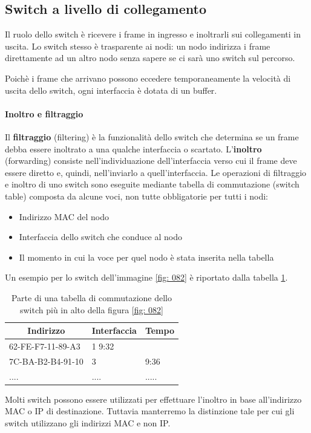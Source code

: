 \documentclass[11pt,a4paper]{book}
\begin{document}
\subsection{Switch a livello di collegamento}
Il ruolo dello switch è ricevere i frame in ingresso e inoltrarli sui collegamenti in uscita. Lo switch stesso è trasparente ai nodi: un nodo indirizza i frame direttamente ad un altro nodo senza sapere se ci sarà uno switch sul percorso.

Poichè i frame che arrivano possono eccedere temporaneamente la velocità di uscita dello switch, ogni interfaccia è dotata di un buffer.

\paragraph{Inoltro e filtraggio}
Il \textbf{filtraggio} (filtering) è la funzionalità dello switch che determina se un frame debba essere inoltrato a una qualche interfaccia o scartato. L'\textbf{inoltro} (forwarding) consiste nell'individuazione dell'interfaccia verso cui il frame deve essere diretto e, quindi, nell'inviarlo a quell'interfaccia. Le operazioni di filtraggio e inoltro di uno switch sono eseguite mediante tabella di commutazione (switch table) composta da alcune voci, non tutte obbligatorie per tutti i nodi:
\begin{itemize}
	\item Indirizzo MAC del nodo
	\item Interfaccia dello switch che conduce al nodo
	\item Il momento in cui la voce per quel nodo è stata inserita nella tabella
\end{itemize}
Un esempio per lo switch dell'immagine \ref{fig: 082} è riportato dalla tabella \ref{tab: 003}.
\begin{table}[]
	\begin{tabular}{|l|l|l|}
		\hline
		\multicolumn{1}{|c|}{\textbf{Indirizzo}} & \multicolumn{1}{c|}{\textbf{Interfaccia}} & \multicolumn{1}{c|}{\textbf{Tempo}} \\ \hline
		62-FE-F7-11-89-A3 				& 1				  9:32				\\ \hline
		7C-BA-B2-B4-91-10				& 3				&9:36				\\ \hline
		....							& ....			& .....				\\ \hline
	\end{tabular}
	\caption{Parte di una tabella di commutazione dello switch più in alto della figura \ref{fig: 082}}
	\label{tab: 003}
\end{table}
Molti switch possono essere utilizzati per effettuare l'inoltro in base all'indirizzo MAC o IP di destinazione. Tuttavia manterremo la distinzione tale per cui gli switch utilizzano gli indirizzi MAC e non IP.
\end{document}
